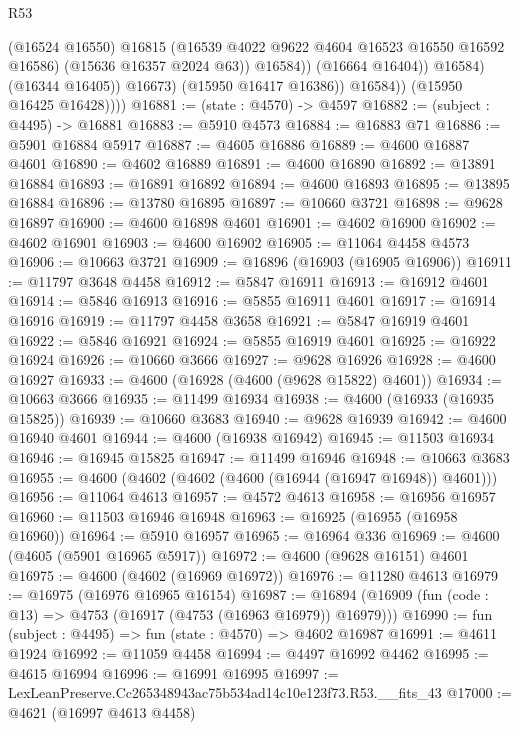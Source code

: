 \begin{lexlean}{R53}
\begin{coremodule}
                              (@16524 @16550)
                              @16815
                              (@16539 @4022 @9622 @4604 @16523 @16550 @16592 @16586)
                              (@15636 @16357 @2024 @63))
                            @16584))
                        (@16664 @16404))
                      @16584)
                    (@16344 @16405))
                  @16673)
                (@15950 @16417 @16386))
              @16584))
          (@15950 @16425 @16428))))
@16881 := (state : @4570) -> @4597
@16882 := (subject : @4495) -> @16881
@16883 := @5910 @4573
@16884 := @16883 @71
@16886 := @5901 @16884 @5917
@16887 := @4605 @16886
@16889 := @4600 @16887 @4601
@16890 := @4602 @16889
@16891 := @4600 @16890
@16892 := @13891 @16884
@16893 := @16891 @16892
@16894 := @4600 @16893
@16895 := @13895 @16884
@16896 := @13780 @16895
@16897 := @10660 @3721
@16898 := @9628 @16897
@16900 := @4600 @16898 @4601
@16901 := @4602 @16900
@16902 := @4602 @16901
@16903 := @4600 @16902
@16905 := @11064 @4458 @4573
@16906 := @10663 @3721
@16909 := @16896 (@16903 (@16905 @16906))
@16911 := @11797 @3648 @4458
@16912 := @5847 @16911
@16913 := @16912 @4601
@16914 := @5846 @16913
@16916 := @5855 @16911 @4601
@16917 := @16914 @16916
@16919 := @11797 @4458 @3658
@16921 := @5847 @16919 @4601
@16922 := @5846 @16921
@16924 := @5855 @16919 @4601
@16925 := @16922 @16924
@16926 := @10660 @3666
@16927 := @9628 @16926
@16928 := @4600 @16927
@16933 := @4600 (@16928 (@4600 (@9628 @15822) @4601))
@16934 := @10663 @3666
@16935 := @11499 @16934
@16938 := @4600 (@16933 (@16935 @15825))
@16939 := @10660 @3683
@16940 := @9628 @16939
@16942 := @4600 @16940 @4601
@16944 := @4600 (@16938 @16942)
@16945 := @11503 @16934
@16946 := @16945 @15825
@16947 := @11499 @16946
@16948 := @10663 @3683
@16955 := @4600 (@4602 (@4602 (@4600 (@16944 (@16947 @16948)) @4601)))
@16956 := @11064 @4613
@16957 := @4572 @4613
@16958 := @16956 @16957
@16960 := @11503 @16946 @16948
@16963 := @16925 (@16955 (@16958 @16960))
@16964 := @5910 @16957
@16965 := @16964 @336
@16969 := @4600 (@4605 (@5901 @16965 @5917))
@16972 := @4600 (@9628 @16151) @4601
@16975 := @4600 (@4602 (@16969 @16972))
@16976 := @11280 @4613
@16979 := @16975 (@16976 @16965 @16154)
@16987 := @16894 (@16909 (fun (code : @13) => @4753 (@16917 (@4753 (@16963 @16979)) @16979)))
@16990 := fun (subject : @4495) => fun (state : @4570) => @4602 @16987
@16991 := @4611 @1924
@16992 := @11059 @4458
@16994 := @4497 @16992 @4462
@16995 := @4615 @16994
@16996 := @16991 @16995
@16997 := LexLeanPreserve.Cc265348943ac75b534ad14c10e123f73.R53.__fits_43
@17000 := @4621 (@16997 @4613 @4458)

\end{coremodule}
\end{lexlean}
